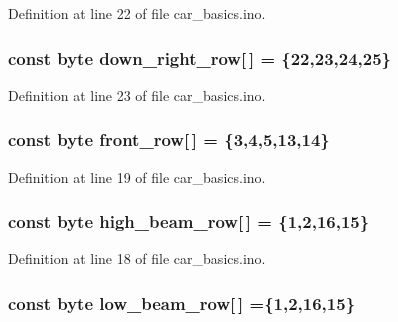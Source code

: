 Definition at line 22 of file car\+\_\+basics.\+ino.

\subsubsection[{\texorpdfstring{down\+\_\+right\+\_\+row}{down_right_row}}]{\setlength{\rightskip}{0pt plus 5cm}const byte down\+\_\+right\+\_\+row\mbox{[}$\,$\mbox{]} = \{22,23,24,25\}}\hypertarget{group__car_gadbf10ff9ee353128c568e07c32b1ffa9}{}\label{group__car_gadbf10ff9ee353128c568e07c32b1ffa9}


Definition at line 23 of file car\+\_\+basics.\+ino.

\subsubsection[{\texorpdfstring{front\+\_\+row}{front_row}}]{\setlength{\rightskip}{0pt plus 5cm}const byte front\+\_\+row\mbox{[}$\,$\mbox{]} = \{3,4,5,13,14\}}\hypertarget{group__car_ga5009aa0cbe6b32a72b085489b027800e}{}\label{group__car_ga5009aa0cbe6b32a72b085489b027800e}


Definition at line 19 of file car\+\_\+basics.\+ino.

\subsubsection[{\texorpdfstring{high\+\_\+beam\+\_\+row}{high_beam_row}}]{\setlength{\rightskip}{0pt plus 5cm}const byte high\+\_\+beam\+\_\+row\mbox{[}$\,$\mbox{]} = \{1,2,16,15\}}\hypertarget{group__car_ga1ecea646e1c5dcdfc643287a5f2041bb}{}\label{group__car_ga1ecea646e1c5dcdfc643287a5f2041bb}


Definition at line 18 of file car\+\_\+basics.\+ino.

\subsubsection[{\texorpdfstring{low\+\_\+beam\+\_\+row}{low_beam_row}}]{\setlength{\rightskip}{0pt plus 5cm}const byte low\+\_\+beam\+\_\+row\mbox{[}$\,$\mbox{]} =\{1,2,16,15\}}\hypertarget{group__car_ga1a25903a2850d9849775664473070489}{}\label{group__car_ga1a25903a2850d9849775664473070489}


